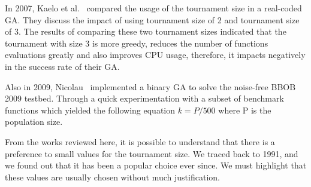 In 2007, Kaelo et al.~\cite{kaelo2007integrated} compared the usage of the tournament size in a real-coded GA. They discuss the impact of using tournament size of 2 and tournament size of 3. The results of comparing these two tournament sizes indicated that the tournament with size 3 is more greedy, reduces the number of functions evaluations greatly and also improves CPU usage, therefore, it impacts negatively in the success rate of their GA.


Also in 2009, Nicolau~\cite{nicolau2009application} implemented a binary GA to solve the noise-free BBOB 2009 testbed. Through a quick experimentation with a subset of benchmark functions which yielded the following equation $k = P/500$ where P is the population size.

From the works reviewed here, it is possible to understand that there is a preference to small values for the tournament size. We traced back to 1991, and we found out that it has been a popular choice ever since. We must highlight that these values are usually chosen without much justification.





